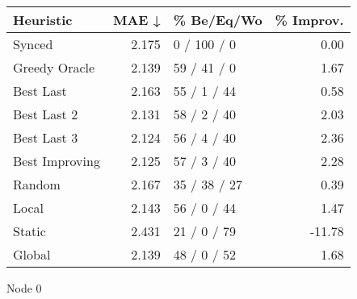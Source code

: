 \begin{tabular}{lrlr}
\toprule
\textbf{Heuristic} & \textbf{MAE ↓} & \textbf{\% Be/Eq/Wo} & \textbf{\% Improv.} \\
\midrule
            Synced &          2.175 &          0 / 100 / 0 &                0.00 \\
     Greedy Oracle &          2.139 &          59 / 41 / 0 &                1.67 \\
         Best Last &          2.163 &          55 / 1 / 44 &                0.58 \\
       Best Last 2 &          2.131 &          58 / 2 / 40 &                2.03 \\
       Best Last 3 &          2.124 &          56 / 4 / 40 &                2.36 \\
    Best Improving &          2.125 &          57 / 3 / 40 &                2.28 \\
            Random &          2.167 &         35 / 38 / 27 &                0.39 \\
             Local &          2.143 &          56 / 0 / 44 &                1.47 \\
            Static &          2.431 &          21 / 0 / 79 &              -11.78 \\
            Global &          2.139 &          48 / 0 / 52 &                1.68 \\
\bottomrule
\end{tabular}
\caption{Node 0}
\label{tab:ds_iid_lr01_le2_bs2_0}
